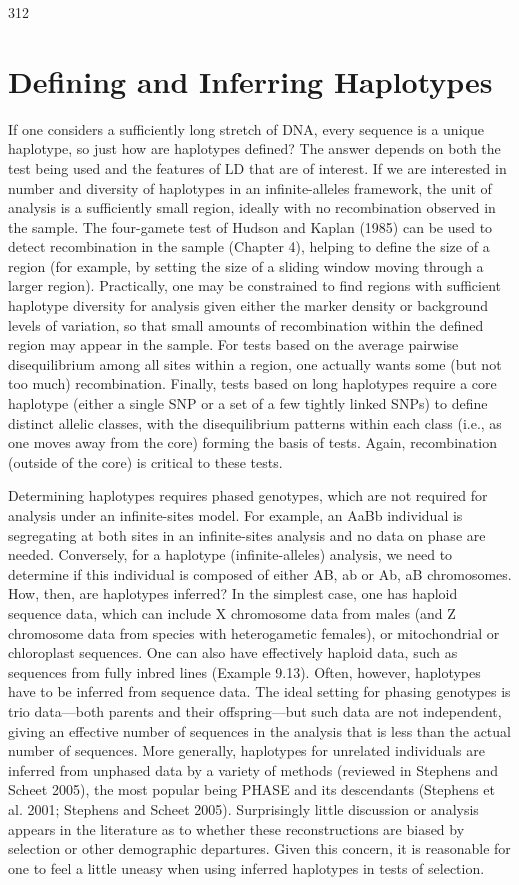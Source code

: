 \documentclass{article}
\begin{document}
312

\section{Defining and Inferring Haplotypes}
If one considers a sufficiently long stretch of DNA, every sequence is a unique haplotype, so just how are haplotypes defined? The answer depends on both the test being used and the features of LD that are of interest. If we are interested in number and diversity of haplotypes in an infinite-alleles framework, the unit of analysis is a sufficiently small region, ideally with no recombination observed in the sample. The four-gamete test of Hudson and Kaplan (1985) can be used to detect recombination in the sample (Chapter 4), helping to define the size of a region (for example, by setting the size of a sliding window moving through a larger region). Practically, one may be constrained to find regions with sufficient haplotype diversity for analysis given either the marker density or background levels of variation, so that small amounts of recombination within the defined region may appear in the sample. For tests based on the average pairwise disequilibrium among all sites within a region, one actually wants some (but not too much) recombination. Finally, tests based on long haplotypes require a core haplotype (either a single SNP or a set of a few tightly linked SNPs) to define distinct allelic classes, with the disequilibrium patterns within each class (i.e., as one moves away from the core) forming the basis of tests. Again, recombination (outside of the core) is critical to these tests.

Determining haplotypes requires phased genotypes, which are not required for analysis under an infinite-sites model. For example, an AaBb individual is segregating at both sites in an infinite-sites analysis and no data on phase are needed. Conversely, for a haplotype (infinite-alleles) analysis, we need to determine if this individual is composed of either AB, ab or Ab, aB chromosomes. How, then, are haplotypes inferred? In the simplest case, one has haploid sequence data, which can include X chromosome data from males (and Z chromosome data from species with heterogametic females), or mitochondrial or chloroplast sequences. One can also have effectively haploid data, such as sequences from fully inbred lines (Example 9.13). Often, however, haplotypes have to be inferred from sequence data. The ideal setting for phasing genotypes is trio data—both parents and their offspring—but such data are not independent, giving an effective number of sequences in the analysis that is less than the actual number of sequences. More generally, haplotypes for unrelated individuals are inferred from unphased data by a variety of methods (reviewed in Stephens and Scheet 2005), the most popular being PHASE and its descendants (Stephens et al. 2001; Stephens and Scheet 2005). Surprisingly little discussion or analysis appears in the literature as to whether these reconstructions are biased by selection or other demographic departures. Given this concern, it is reasonable for one to feel a little uneasy when using inferred haplotypes in tests of selection.
\end{document}
